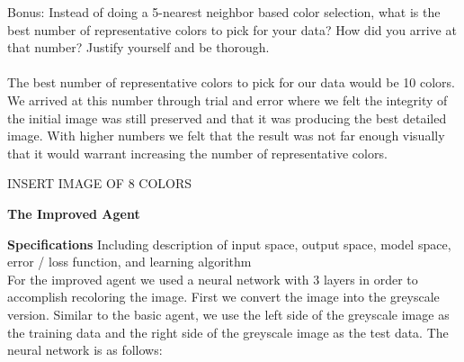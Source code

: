 \documentclass{article}
\theoremstyle{definition}
\begin{document}
 Bonus: Instead of doing a 5-nearest neighbor based color selection, what is the best number of representative colors to pick for your data? How did you arrive at that number? Justify yourself and be thorough. \\\\
 The best number of representative colors to pick for our data would be 10 colors. We arrived at this number through trial and error where we felt the integrity of the initial image was still preserved and that it was producing the best detailed image. With higher numbers we felt that the result was not far enough visually that it would warrant increasing the number of representative colors. 
 
 INSERT IMAGE OF 8 COLORS

\textbf{\Large The Improved Agent} \\

    \begin{figure}[H]
        \centering
    \end{figure}

	\textbf{Specifications}
	    Including description of input space, output space, model space, error / loss function, and learning algorithm \\
        For the improved agent we used a neural network with 3 layers in order to accomplish recoloring the image. First we convert the image into the greyscale version. Similar to the basic agent, we use the left side of the greyscale image as the training data and the right side of the greyscale image as the test data.
        The neural network is as follows: \\
\end{document}
